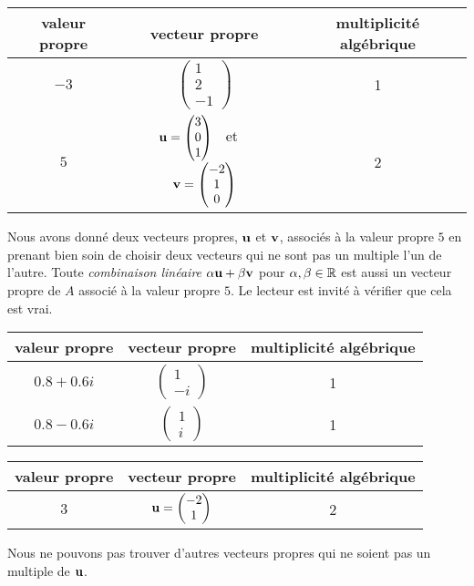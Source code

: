 {
\begin{center}
\begin{tabular}{c|c|c}
valeur propre & vecteur propre & multiplicité algébrique \\
\hline
\rule{0em}{2.5em} $-3$ &
$\displaystyle \begin{pmatrix} 1 \\ 2 \\ -1 \end{pmatrix}$ & 1 \\[1.5em]
$5$ & $\mathbf{u} = \displaystyle \begin{pmatrix} 3 \\ 0 \\ 1 \end{pmatrix}$
\ et \ 
$\mathbf{v} = \displaystyle \begin{pmatrix} -2 \\ 1 \\ 0 \end{pmatrix}$ & 2
\end{tabular}
\end{center}
Nous avons donné deux vecteurs propres, $\mathbf{u}$ et $\mathbf{v}$, associés à
la valeur propre $5$ en prenant bien soin de choisir deux vecteurs qui
ne sont pas un multiple l'un de l'autre.  Toute
{\em combinaison linéaire} $\alpha \mathbf{u} + \beta \mathbf{v}$ pour
$\alpha, \beta \in \mathbb{R}$ est aussi un vecteur propre de $A$ associé à
la valeur propre $5$.  Le lecteur est invité à vérifier que cela est
vrai.

\begin{center}
\begin{tabular}{c|c|c}
valeur propre & vecteur propre & multiplicité algébrique \\
\hline
\rule{0em}{2em} $0.8+0.6 i$ &
$\displaystyle \begin{pmatrix} 1 \\ -i \end{pmatrix}$ & 1 \\[1em]
$0.8- 0.6 i$ & $\displaystyle \begin{pmatrix} 1 \\ i \end{pmatrix}$ & 1
\end{tabular}
\end{center}

\begin{center}
\begin{tabular}{c|c|c}
valeur propre & vecteur propre & multiplicité algébrique \\
\hline
\rule{0em}{2em} $3$ &
$\mathbf{u} = \displaystyle \begin{pmatrix} -2 \\ 1 \end{pmatrix}$ & 2
\end{tabular}
\end{center}
Nous ne pouvons pas trouver d'autres vecteurs propres qui ne soient pas un
multiple de $\mathbf{u}$.

}
